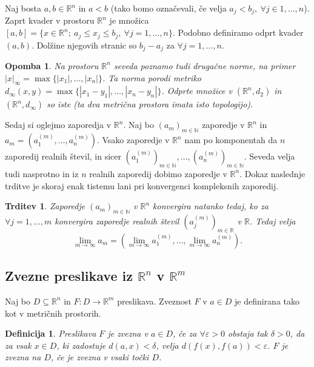 \documentclass[10pt, a4paper]{article}
\newtheorem{trditev}[izr]{Trditev}
\newtheorem{defi}{Definicija}[section]
\newenvironment{noticeB}{%
  \tcolorbox[%
  notitle,
  empty,
  enhanced,  %
  breakable,
  coltext=black,
  colback=white, 
  fontupper=\rmfamily,
  parbox=false,
  noparskip,
  sharp corners,
  boxrule=-1pt,  %
  frame hidden,
  left=7pt,  %
  right=7pt,
  top=5pt,
  bottom=5pt,
  before skip=2.5ex plus 2pt,
  after skip=2.5ex plus 2pt,
  borderline west = {1.5pt}{-0.1pt}{blue!30!black}, %
  overlay unbroken and last={%
    \draw[color=black, line width=1.25pt]
    ($(frame.south west)+(1.pt, -0.1pt)$) -- ++(2em, 0);
  }
  ]}
{\endtcolorbox}
\newenvironment{definicija}{\begin{defi}\begin{noticeB}}{%
    \end{noticeB}\end{defi}}
\newtheorem*{opomba}{Opomba}
\newcommand{\N}{\mathbb {N}}
\newcommand{\R}{\mathbb {R}}
\begin{document}
Naj bosta $a, b \in \R^n$ in $a < b$ (tako bomo označevali, če velja $a_j < b_j,\ \forall j \in 1, \dots, n$). 
Zaprt kvader v prostoru $\R^n$ je množica $[a, b] = \{x \in \R^n;\ a_j \leq x_j \leq b_j,\ \forall j = 1, \dots, n\}$.
Podobno definiramo odprt kvader $(a, b)$. Dolžine njegovih stranic so $b_j - a_j$ za $\forall j = 1, \dots, n$.

\begin{opomba}
    Na prostoru $\R^n$ seveda poznamo tudi drugačne norme, na primer
    $|x|_\infty = \max \{|x_1|, \dots, |x_n|\}$.
    Ta norma porodi metriko $d_\infty (x, y) = \max \{|x_1 - y_1|, \dots, |x_n - y_n|\}$.
    Odprte množice v $(\R^n, d_2)$ in $(\R^n, d_\infty)$ so iste (ta dva metrična prostora imata isto topologijo).
\end{opomba}

Sedaj si oglejmo zaporedja v $\R^n$. Naj bo $(a_m)_{m \in \N}$ zaporedje v $\R^n$ 
in $a_m = (a_1 ^{(m)}, \dots, a_n ^{(m)})$. Vsako zaporedje v $\R^n$ nam po komponentah 
da $n$ zaporedij realnih števil, in sicer $(a_1 ^{(m)})_{m \in \N},\dots, (a_n ^{(m)})_{m \in \N}$.
Seveda velja tudi nasprotno in iz $n$ realnih zaporedij dobimo zaporedje v $\R^n$.
Dokaz naslednje trditve je skoraj enak tistemu lani pri konvergenci kompleksnih zaporedij.

\begin{trditev}
    Zaporedje $(a_m)_{m \in \N}$ v $\R^n$ konvergira natanko tedaj, ko za $\forall j = 1, \dots, m$ konvergira 
    zaporedje realnih števil $(a_j ^{(m)})_{m \in \R}$ v $\R$. Tedaj velja 
    $$\lim_{m \to \infty} a_m = (\lim_{m \to \infty} a_1 ^{(m)}, \dots, \lim_{m \to \infty} a_n ^{(m)}).$$
\end{trditev}

\subsection{Zvezne preslikave iz $\R^n$ v $\R^m$}

Naj bo $D \subseteq \R^n$ in $F: D \rightarrow \R^m$ preslikava.
Zveznost $F$ v $a \in D$ je definirana tako kot v metričnih prostorih.

\begin{definicija}
    Preslikava $F$ je zvezna v $a \in D$, če za $\forall \varepsilon > 0$ obstaja tak $\delta > 0$,
    da za vsak $x \in D$, ki zadostuje $d(a, x) < \delta$, velja $d(f(x), f(a)) < \varepsilon$.
    $F$ je zvezna na $D$, če je zvezna v vsaki točki $D$.
\end{definicija}
\end{document}
